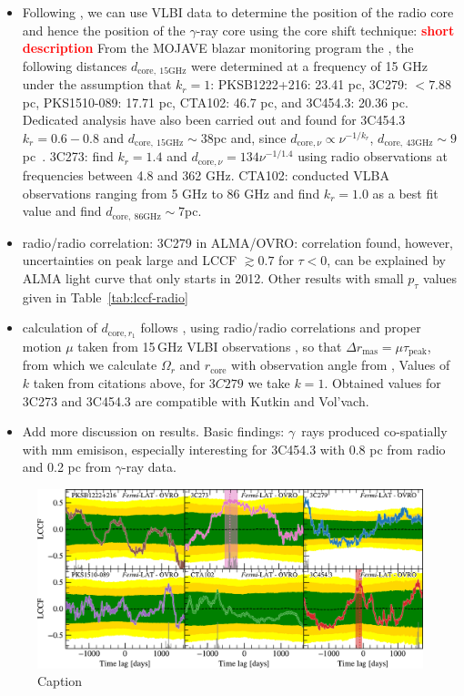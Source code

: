 \documentclass[twocolumn]{aastex62}
\newcommand{\Grays}{$\gamma$~rays\xspace}
\newcommand{\gray}{$\gamma$-ray\xspace}
\newcommand{\todo}[1]{\textbf{\textcolor{red}{#1}}}
\begin{document}
\begin{itemize}
    \item Following \citet{2014MNRAS.441.1899F}, we can use VLBI data to determine the position of the radio core and hence the position of the \gray core using the core shift technique: \todo{short description}
    From the MOJAVE blazar monitoring program the \citep{2012A&A...545A.113P}, the following distances $d_\mathrm{core,~15GHz}$ were determined at a frequency of 15 GHz under the assumption that $k_r = 1$: PKSB1222+216: 23.41 pc, 3C279: $<7.88$ pc, PKS1510-089: 17.71 pc,
    CTA102: 46.7 pc, and 3C454.3: 20.36 pc. Dedicated analysis have also been carried out and found for 3C454.3 $k_r = 0.6-0.8$ and $d_\mathrm{core,~15GHz} \sim 38$pc and, since $d_{\mathrm{core},\nu}\propto\nu^{-1/k_r}$,  $d_\mathrm{core,~43GHz} \sim 9$pc~\citep{2014MNRAS.437.3396K}. 3C273: \citet{2013ARep...57...34V} find $k_r = 1.4$ and $d_{\mathrm{core},\nu} = 134\nu^{-1/1.4}$ using radio observations at frequencies between 4.8 and 362 GHz.
    CTA102: \citet{2015A&A...576A..43F} conducted VLBA observations ranging from 5 GHz to 86 GHz and find $k_r = 1.0$ as a best fit value and find $d_{\mathrm{core,~86GHz}}\sim7$pc.
    \item radio/radio correlation: 3C279 in ALMA/OVRO: correlation found, however, uncertainties on peak large and LCCF $\gtrsim 0.7$ for $\tau < 0$, can be explained by ALMA light curve that only starts in 2012. Other results with small $p_\tau$ values given in Table~\ref{tab:lccf-radio}
    \item calculation of $d_{\mathrm{core},r_1}$ follows \citet{2014MNRAS.441.1899F}, using radio/radio correlations and  proper motion $\mu$ taken from 15\,GHz VLBI observations \citep{2016AJ....152...12L}, so that $\Delta r_\mathrm{mas} = \mu \tau_\mathrm{peak}$, from which we calculate $\Omega_r$ and $r_\mathrm{core}$ \citep{1998A&A...330...79L} with observation angle from \citet{2017ApJ...846...98J}, Values of $k$ taken from citations above, for $3C279$ we take $k = 1$. Obtained values for 3C273 and 3C454.3 are compatible with Kutkin and Vol'vach. 
    \item Add more discussion on results. Basic findings: \Grays produced co-spatially with mm emisison, especially interesting for 3C454.3 with 0.8 pc from radio and 0.2 pc from \gray data.
\end{itemize}

\begin{figure}
    \centering
    \includegraphics[width = .9\linewidth]{figures/lccf__nsim5000_fermi_EM13gaps-data_ovro_MM14gaps-none_lccf.pdf}
    \caption{Caption}
    \label{fig:lccf-ovro}
\end{figure}
\end{document}
